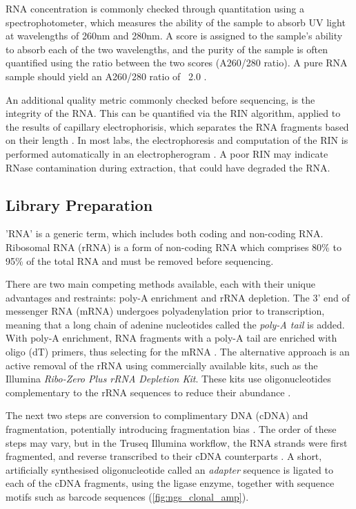 RNA concentration is commonly checked through quantitation using a spectrophotometer, which measures the ability of the sample to absorb UV light at wavelengths of 260nm and 280nm. A score is assigned to the sample's ability to absorb each of the two wavelengths, and the purity of the sample is often quantified using the ratio between the two scores (A260/280 ratio). A pure RNA sample should yield an A260/280 ratio of ~2.0 \citep{scientific2013t042}.

An additional quality metric commonly checked before sequencing, is the integrity of the RNA. This can be quantified via the \ac{RIN} algorithm, applied to the results of capillary electrophorisis, which separates the RNA fragments based on their length \citep{schroeder2006rin}. In most labs, the electrophoresis and computation of the \ac{RIN} is performed automatically in an electropherogram \citep{chamieh2015quantitative}. A poor \ac{RIN} may indicate RNase contamination during extraction, that could have degraded the RNA.

\subsection{Library Preparation}
'RNA' is a generic term, which includes both coding and non-coding RNA. Ribosomal RNA (rRNA) is a form of non-coding RNA which comprises 80\% to 95\% of the total RNA \citep{o2013ribosomal, kukurba2015rna} and must be removed before sequencing. 

There are two main competing methods available, each with their unique advantages and restraints: poly-A enrichment and rRNA depletion. The 3' end of messenger RNA (mRNA) undergoes polyadenylation prior to transcription, meaning that a long chain of adenine nucleotides called the \textit{poly-A tail} is added. With poly-A enrichment, RNA fragments with a poly-A tail are enriched with oligo (dT) primers, thus selecting for the mRNA \citep{zhao2014comparison}. The alternative approach is an active removal of the rRNA using commercially available kits, such as the Illumina \textit{Ribo-Zero Plus rRNA Depletion Kit}. These kits use oligonucleotides complementary to the rRNA sequences to reduce their abundance \citep{griffith2015informatics, peano2013efficient}. 

The next two steps are conversion to complimentary DNA (cDNA) and fragmentation, potentially introducing fragmentation bias \citep{poptsova2014non}. The order of these steps may vary, but in the Truseq Illumina workflow, the RNA strands were first fragmented, and reverse transcribed to their cDNA counterparts \citep{pease2012rapid}. A short, artificially synthesised oligonucleotide called an \textit{adapter} sequence is ligated to each of the cDNA fragments, using the ligase enzyme, together with sequence motifs such as barcode sequences \citep{pease2012rapid} (\autoref{fig:ngs_clonal_amp}).

